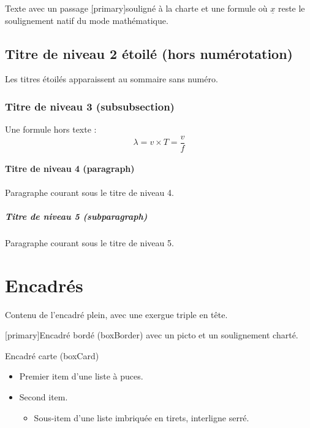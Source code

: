 Texte avec un passage \underline[primary]{souligné à la charte} et une formule où \( \underline{x} \) reste le soulignement natif du mode mathématique.

\subsection*{Titre de niveau 2 étoilé (hors numérotation)}

Les titres étoilés apparaissent au sommaire sans numéro.

\subsubsection{Titre de niveau 3 (subsubsection)}

Une formule hors texte :
\[
\lambda = v \times T = \frac{v}{f}
\]

\paragraph{Titre de niveau 4 (paragraph)}

Paragraphe courant sous le titre de niveau 4.

\subparagraph{Titre de niveau 5 (subparagraph)}

Paragraphe courant sous le titre de niveau 5.

\section{Encadrés}

\begin{boxFill}[primary]

Contenu de l'encadré plein, avec une exergue triple en tête.
\end{boxFill}

\begin{boxBorder}[secondary]
\pictoWarning{} \underline[primary]{Encadré bordé (boxBorder)} avec un picto et un soulignement charté.
\end{boxBorder}

\begin{boxCard}[primary]{Encadré carte (boxCard)}
\begin{itemize}[bullet][primary]
  \item Premier item d'une liste à puces.
  \item Second item.
  \begin{itemize}[dash][secondary][tight]
    \item Sous-item d'une liste imbriquée en tirets, interligne serré.
  \end{itemize}
\end{itemize}
\end{boxCard}

